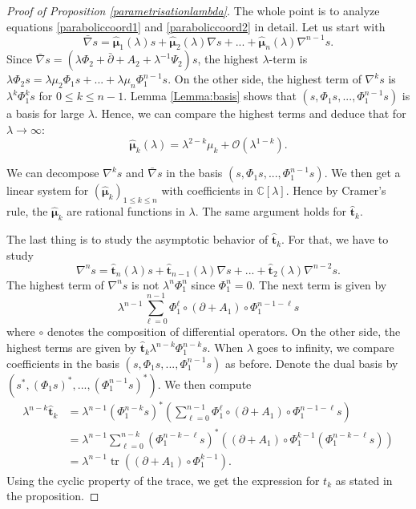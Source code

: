 \documentclass[11pt]{amsart}
\numberwithin{thm}{section} %
\numberwithin{equation}{section} %
\numberwithin{figure}{section} %
\newcommand*{\C}{\mathbb{C}}
\renewcommand*{\l}{\lambda}
\DeclareMathOperator{\tr}{tr}
\begin{document}
\begin{proof}[Proof of Proposition \ref{parametrisationlambda}]
The whole point is to analyze equations \eqref{paraboliccoord1} and \eqref{paraboliccoord2} in detail.
Let us start with $$\bar{\nabla}s = \bm\hat{\mu}_1(\l) s + \bm\hat{\mu}_2(\l) \nabla s + ... + \bm\hat{\mu}_n(\l) \nabla^{n-1}s.$$
Since $\bar{\nabla}s=(\l\Phi_2+\bar{\partial}+A_2+\l^{-1}\Psi_2)s$, the highest $\l$-term is $\l\Phi_2s=\l\mu_2\Phi_1s+...+\l\mu_n\Phi_1^{n-1}s$. On the other side, the highest term of $\nabla^ks$ is $\l^k\Phi_1^ks$ for $0\leq k \leq n-1$. Lemma \ref{Lemma:basis} shows that $(s, \Phi_1s, ..., \Phi_1^{n-1}s)$ is a basis for large $\l$. Hence, we can compare the highest terms and deduce that for $\l\rightarrow \infty$: $$\bm\hat{\mu}_k(\l) = \l^{2-k}\mu_k+\mathcal{O}(\l^{1-k}).$$ 

We can decompose $\nabla^ks$ and $\bar{\nabla}s$ in the basis $(s,\Phi_1s,...,\Phi_1^{n-1}s)$. We then get a linear system for $(\bm\hat{\mu}_k)_{1\leq k\leq n}$ with coefficients in $\C[\l]$. Hence by Cramer's rule, the $\bm\hat{\mu}_k$ are rational functions in $\l$. 
The same argument holds for $\bm\hat{t}_k$.

The last thing is to study the asymptotic behavior of $\bm\hat{t}_k$. For that, we have to study
$$\nabla^n s = \bm\hat{t}_{n}(\l)s + \bm\hat{t}_{n-1}(\l) \nabla s+...+\bm\hat{t}_{2}(\l)\nabla^{n-2}s.$$ 
The highest term of $\nabla^ns$ is not $\l^n \Phi_1^n$ since $\Phi_1^n=0$. The next term is given by $$\l^{n-1}\sum_{\ell=0}^{n-1}\Phi_1^\ell \circ(\partial+A_1)\circ\Phi_1^{n-1-\ell}s$$ where $\circ$ denotes the composition of differential operators.
On the other side, the highest terms are given by $\bm\hat{t}_k\l^{n-k}\Phi_1^{n-k}s$. When $\l$ goes to infinity, we compare coefficients in the basis $(s, \Phi_1s, ..., \Phi_1^{n-1}s)$ as before. Denote the dual basis by $(s^*,(\Phi_1 s)^*,...,(\Phi_1^{n-1}s)^*)$. We then compute
\begin{align*}
\l^{n-k}\bm\hat{t}_k &= \l^{n-1} (\Phi_1^{n-k}s)^*\left(\sum_{\ell=0}^{n-1}\Phi_1^\ell \circ(\partial+A_1)\circ\Phi_1^{n-1-\ell}s \right) \\
&= \l^{n-1}\sum_{\ell=0}^{n-k} (\Phi_1^{n-k-\ell}s)^*\left((\partial +A_1)\circ\Phi_1^{k-1}(\Phi_1^{n-k-\ell} s)\right) \\
&= \l^{n-1}\tr((\partial+A_1)\circ\Phi_1^{k-1}).
\end{align*}
Using the cyclic property of the trace, we get the expression for $t_k$ as stated in the proposition. 
\end{proof}
\end{document}
